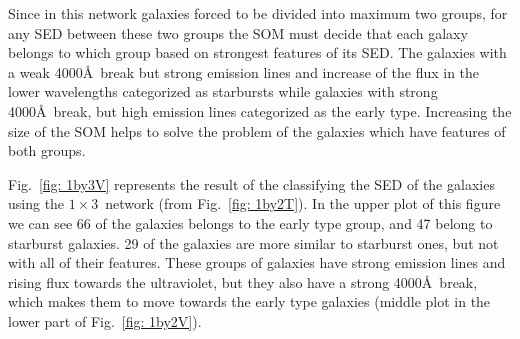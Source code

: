             Since in this network galaxies forced to be divided into maximum two groups, for any SED between these two groups the SOM must decide that each galaxy belongs to which group based on strongest features of its SED.
            The galaxies with a weak 4000\AA~break but strong emission lines and increase of the flux in the lower wavelengths categorized as starbursts while galaxies with strong 4000\AA~break, but high emission lines categorized as the early type.
            Increasing the size of the SOM helps to solve the problem of the galaxies which have features of both groups.
            
             Fig.~\ref{fig: 1by3V} represents the result of the classifying the SED of the galaxies using the $1\times3$~network (from Fig.~\ref{fig: 1by2T}). 
             In the upper plot of this figure we can see 66 of the galaxies belongs to the early type group, and 47 belong to starburst galaxies. 
             29 of the galaxies are more similar to starburst ones, but not with all of their features. 
             These groups of galaxies have strong emission lines and rising flux towards the ultraviolet, but they also have a strong 4000\AA~break, which makes them to move towards the early type galaxies (middle plot in the lower part of Fig.~\ref{fig: 1by2V}).

